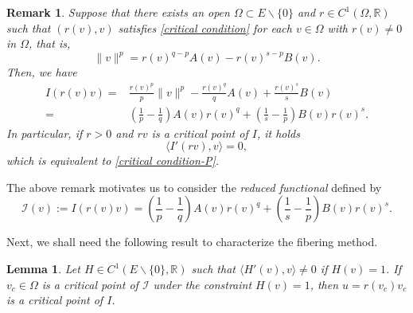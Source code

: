 \documentclass[12pt,reqno]{amsart}
\newtheorem{lemma}[theorem]{Lemma}
\newtheorem{remark}[theorem]{Remark}
\begin{document}
\begin{remark}\label{key remark}
    Suppose that there exists an open $\Omega\subset E\backslash\{0\}$ and $r \in C^1(\Omega, \mathds{R})$ such that $(r(v),v)$ satisfies \eqref{critical condition} for each $v \in \Omega$ with $r(v)\neq 0$ in $\Omega$, that is,
     \begin{equation}\label{critical condition-P}
		\|v\|^p=r(v)^{q-p}A(v)-r(v)^{s-p}B(v).
	\end{equation}
    Then, we have	
	\begin{align*}
		I(r(v)v)=&\frac{r(v)^p}{p}\|v\|^p-\frac{r(v)^q}{q}A(v)+\frac{r(v)^s}{s}B(v)\\
			=&\left(\frac{1}{p}-\frac{1}{q}\right)A(v)r(v)^q+\left(\frac{1}{s}-\frac{1}{p}\right)B(v)r(v)^s.
	\end{align*}
 In particular,  if $r>0$ and $rv$ is a critical point of $I$, it holds
$$
		\langle I'(rv),v\rangle=0,
$$
	which is equivalent to \eqref{critical condition-P}.
\end{remark}
The above remark motivates us to consider the \textit{reduced functional} defined by
\begin{equation}\label{reduced functional}
	\mathcal{I}(v):=I(r(v)v)=\left(\frac{1}{p}-\frac{1}{q}\right)A(v)r(v)^q+\left(\frac{1}{s}-\frac{1}{p}\right)B(v)r(v)^s.
\end{equation}

Next, we shall need the following result to characterize the fibering method.

\begin{lemma}\label{fibering method }Let $H\in C^1(E\backslash\{0\},\mathds{R})$ such that $\langle H'(v),v\rangle \neq 0$ if $H(v)=1$. If $v_c \in \Omega$ is a critical point of $\mathcal{I}$ under the constraint $H(v)=1$, then $u=r(v_c)v_c$ is a critical point of $I$.
\end{lemma}
\end{document}
